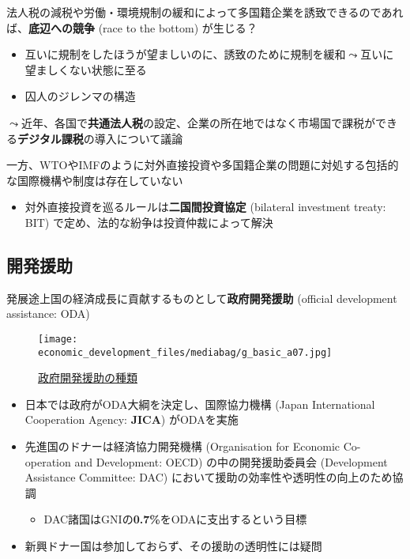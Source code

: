 \documentclass[
  xelatex,
  ja=standard]{bxjsarticle}
\providecommand{\tightlist}{%
  \setlength{\itemsep}{0pt}\setlength{\parskip}{0pt}}\usepackage{longtable,booktabs,array}
\begin{document}
法人税の減税や労働・環境規制の緩和によって多国籍企業を誘致できるのであれば、\textbf{底辺への競争}
(race to the bottom) が生じる？

\begin{itemize}
\tightlist
\item
  互いに規制をしたほうが望ましいのに、誘致のために規制を緩和\(\leadsto\)互いに望ましくない状態に至る
\item
  囚人のジレンマの構造
\end{itemize}

\(\leadsto\)近年、各国で\textbf{共通法人税}の設定、企業の所在地ではなく市場国で課税ができる\textbf{デジタル課税}の導入について議論

一方、WTOやIMFのように対外直接投資や多国籍企業の問題に対処する包括的な国際機構や制度は存在していない

\begin{itemize}
\tightlist
\item
  対外直接投資を巡るルールは\textbf{二国間投資協定} (bilateral
  investment treaty: BIT) で定め、法的な紛争は投資仲裁によって解決
\end{itemize}

\hypertarget{ux958bux767aux63f4ux52a9}{%
\subsection{開発援助}\label{ux958bux767aux63f4ux52a9}}

発展途上国の経済成長に貢献するものとして\textbf{政府開発援助} (official
development assistance: ODA)

\begin{figure}[htpb]

{\centering \texttt{[image: economic\_development\_files/mediabag/g\_basic\_a07.jpg]}

}

\caption{\href{https://www.jica.go.jp/Resource/aboutoda/basic/03.html}{政府開発援助の種類}}

\end{figure}

\begin{itemize}
\tightlist
\item
  日本では政府がODA大綱を決定し、国際協力機構 (Japan International
  Cooperation Agency: \textbf{JICA}) がODAを実施
\item
  先進国のドナーは経済協力開発機構 (Organisation for Economic
  Co-operation and Development: OECD) の中の開発援助委員会 (Development
  Assistance Committee: DAC)
  において援助の効率性や透明性の向上のため協調

  \begin{itemize}
  \tightlist
  \item
    DAC諸国はGNIの\textbf{0.7\%}をODAに支出するという目標
  \end{itemize}
\item
  新興ドナー国は参加しておらず、その援助の透明性には疑問
\end{itemize}
\end{document}
